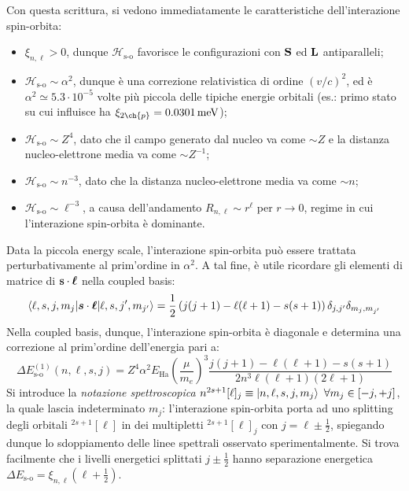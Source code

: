 Con questa scrittura, si vedono immediatamente le caratteristiche dell'interazione spin-orbita:
\begin{itemize}
	\item $ \xi_{n,\ell} > 0 $, dunque $ \mathcal{H}_\text{s-o} $ favorisce le configurazioni con $ \mathbf{S} $ ed $ \mathbf{L} $ antiparalleli;
	\item $ \mathcal{H}_\text{s-o} \sim \alpha^2 $, dunque è una correzione relativistica di ordine $ (v/c)^2 $, ed è $ \alpha^2 \simeq 5.3 \cdot 10^{-5} $ volte più piccola delle tipiche energie orbitali (es.: primo stato su cui influisce ha $ \xi_{2\ch{p}} = 0.0301 \,\text{meV} $);
	\item $ \mathcal{H}_\text{s-o} \sim Z^4 $, dato che il campo generato dal nucleo va come $ \sim Z $ e la distanza nucleo-elettrone media va come $ \sim Z^{-1} $;
	\item $ \mathcal{H}_\text{s-o} \sim n^{-3} $, dato che la distanza nucleo-elettrone media va come $ \sim n $;
	\item $ \mathcal{H}_\text{s-o} \sim \ell^{-3} $, a causa dell'andamento $ R_{n,\ell} \sim r^\ell $ per $ r \rightarrow 0 $, regime in cui l'interazione spin-orbita è dominante.
\end{itemize}
Data la piccola energy scale, l'interazione spin-orbita può essere trattata perturbativamente al prim'ordine in $ \alpha^2 $. A tal fine, è utile ricordare gli elementi di matrice di $ \mathbf{s} \cdot \boldsymbol{\ell} $ nella coupled basis:
\begin{equation}
	\braket{\ell,s,j,m_j | \boldsymbol{s} \cdot \boldsymbol{\ell} | \ell,s,j',m_{j'}} = \frac{1}{2} \left( j(j + 1) - \ell (\ell + 1) - s(s + 1) \right) \delta_{j,j'} \delta_{m_j, m_{j'}}
	\label{eq:sl-coupled-basis}
\end{equation}
Nella coupled basis, dunque, l'interazione spin-orbita è diagonale e determina una correzione al prim'ordine dell'energia pari a:
\begin{equation}
	\Delta E^{(1)}_\text{s-o}(n,\ell,s,j) = Z^4 \alpha^2 E_\text{Ha} \left( \frac{\mu}{m_e} \right)^3 \frac{j(j + 1) - \ell(\ell + 1) - s(s + 1)}{2n^3 \ell (\ell + 1) (2\ell + 1)}
	\label{eq:spin-orbit-spectr}
\end{equation}
Si introduce la \textit{notazione spettroscopica} $ n ^{2s+1} [\ell] _j \equiv \ket{n,\ell,s,j, m_j} \,\,\forall m_j \in [-j,+j] $, la quale lascia indeterminato $ m_j $: l'interazione spin-orbita porta ad uno splitting degli orbitali $ ^{2s+1}[\ell] $ in dei multipletti $ ^{2s+1}[\ell]_j $ con $ j = \ell \pm \frac{1}{2} $, spiegando dunque lo sdoppiamento delle linee spettrali osservato sperimentalmente. Si trova facilmente che i livelli energetici splittati $ j \pm \frac{1}{2} $ hanno separazione energetica $ \Delta E_\text{s-o} = \xi_{n,\ell} \left( \ell + \frac{1}{2} \right) $.

